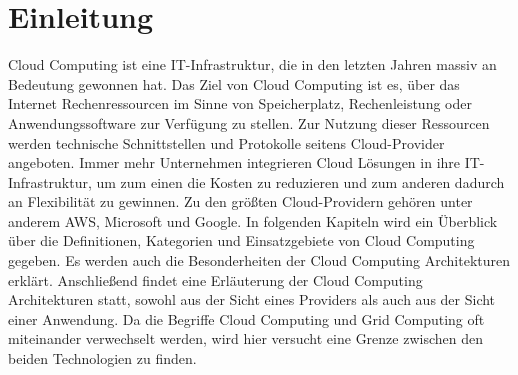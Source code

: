 %
\IEEEpeerreviewmaketitle

\section{Einleitung}
Cloud Computing ist eine IT-Infrastruktur, die in den letzten Jahren massiv an Bedeutung gewonnen hat.
Das Ziel von Cloud Computing ist es, über das Internet Rechenressourcen im Sinne von Speicherplatz, Rechenleistung oder Anwendungssoftware zur Verfügung zu stellen.
Zur Nutzung dieser Ressourcen werden technische Schnittstellen und Protokolle seitens Cloud-Provider angeboten. 
Immer mehr Unternehmen integrieren Cloud Lösungen in ihre IT-Infrastruktur, um zum einen die Kosten zu reduzieren und zum anderen dadurch an Flexibilität zu gewinnen. 
Zu den größten Cloud-Providern gehören unter anderem AWS, Microsoft und Google.
In folgenden Kapiteln wird ein Überblick über die Definitionen, Kategorien und Einsatzgebiete von Cloud Computing gegeben.
Es werden auch die Besonderheiten der Cloud Computing Architekturen erklärt.
Anschließend findet eine Erläuterung der Cloud Computing Architekturen statt, sowohl aus der Sicht eines Providers als auch aus der Sicht einer Anwendung.
Da die Begriffe Cloud Computing und Grid Computing oft miteinander verwechselt werden, wird hier versucht eine Grenze zwischen den beiden Technologien zu finden.
